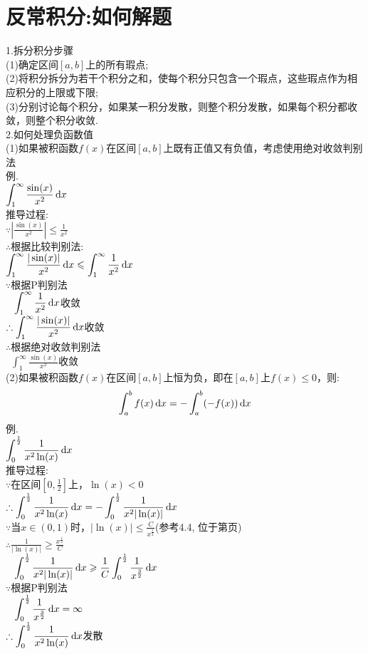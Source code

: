 \chapter{反常积分:如何解题}
1.拆分积分步骤\\
(1)确定区间$[a,b]$上的所有瑕点;\\
(2)将积分拆分为若干个积分之和，使每个积分只包含一个瑕点，这些瑕点作为相应积分的上限或下限;\\
(3)分别讨论每个积分，如果某一积分发散，则整个积分发散，如果每个积分都收敛，则整个积分收敛.\\[2ex]

2.如何处理负函数值\\
(1)如果被积函数$f(x)$在区间$[a,b]$上既有正值又有负值，考虑使用绝对收敛判别法\\
例.\\
$\displaystyle\int_1^{\infty}\frac{\sin(x)}{x^2}\mathop{}\!\mathrm{d} x$\\
推导过程:\\
$\displaystyle\because|\frac{\sin(x)}{x^2}|\leqslant\frac{1}{x^2}$\\
$\therefore$根据比较判别法:\\
$\displaystyle\int_1^{\infty}\frac{|\sin(x)|}{x^2}\mathop{}\!\mathrm{d} x\leqslant\int_1^{\infty}\frac{1}{x^2}\mathop{}\!\mathrm{d} x$\\
$\because$根据P判别法\\
$\displaystyle\phantom{\because}\int_1^{\infty}\frac{1}{x^2}\mathop{}\!\mathrm{d} x$收敛\\[1ex]
$\displaystyle\therefore\int_1^{\infty}\frac{|\sin(x)|}{x^2}\mathop{}\!\mathrm{d} x$收敛\\
$\therefore$根据绝对收敛判别法\\
$\displaystyle\phantom{\therefore}\int_1^{\infty}\frac{\sin(x)}{x^2}$收敛\\[2ex]

(2)如果被积函数$f(x)$在区间$[a,b]$上恒为负，即在$[a,b]$上$f(x)\leqslant 0$，则:\\
\[\int_a^bf(x)\mathop{}\!\mathrm{d} x=-\int_a^b(-f(x))\mathop{}\!\mathrm{d} x\]
例.\\
$\displaystyle\int_0^{\frac{1}{2}}\frac{1}{x^2\ln(x)}\mathop{}\!\mathrm{d} x$\\
推导过程:\\
$\because$在区间$[0,\frac{1}{2}]$上，$\ln(x)<0$\\
$\displaystyle\therefore\int_0^{\frac{1}{2}}\frac{1}{x^2\ln(x)}\mathop{}\!\mathrm{d} x=-\int_0^{\frac{1}{2}}\frac{1}{x^2|\ln(x)|}\mathop{}\!\mathrm{d} x$\\
$\because$当$x\in(0,1)$时，$\displaystyle|\ln(x)|\leqslant\frac{C}{x^{\frac{1}{2}}}$(参考4.4, 位于第\pageref{integral:num_01}页)\\
$\displaystyle\therefore\frac{1}{|\ln(x)|}\geqslant\frac{x^{\frac{1}{2}}}{C}$\\
$\displaystyle\phantom{\therefore}\int_0^{\frac{1}{2}}\frac{1}{x^2|\ln(x)|}\mathop{}\!\mathrm{d} x\geqslant\frac{1}{C}\int_0^{\frac{1}{2}}\frac{1}{x^{\frac{3}{2}}}\mathop{}\!\mathrm{d} x$\\
$\because$根据P判别法\\
$\displaystyle\phantom{\because}\int_0^{\frac{1}{2}}\frac{1}{x^{\frac{3}{2}}}\mathop{}\!\mathrm{d} x=\infty$\\
$\displaystyle\therefore\int_0^{\frac{1}{2}}\frac{1}{x^2\ln(x)}\mathop{}\!\mathrm{d} x$发散\\[2ex]

